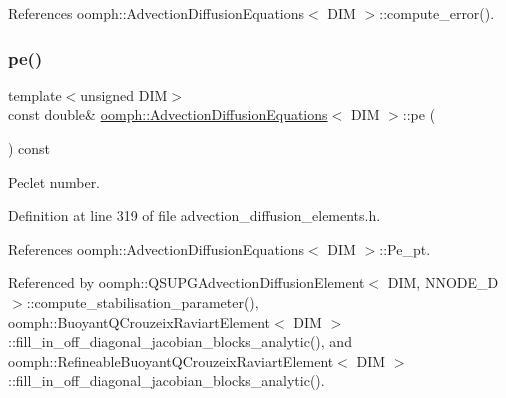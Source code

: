 References oomph\+::\+Advection\+Diffusion\+Equations$<$ D\+I\+M $>$\+::compute\+\_\+error().

\mbox{\label{classoomph_1_1AdvectionDiffusionEquations_ae1dd3fb5d07e98ad2a6b1e38f2f4dc3c}} 
\subsubsection{\texorpdfstring{pe()}{pe()}}
{\footnotesize\ttfamily template$<$unsigned D\+IM$>$ \\
const double\& \hyperlink{classoomph_1_1AdvectionDiffusionEquations}{oomph\+::\+Advection\+Diffusion\+Equations}$<$ D\+IM $>$\+::pe (\begin{DoxyParamCaption}{ }\end{DoxyParamCaption}) const\hspace{0.3cm}{\ttfamily [inline]}}



Peclet number. 



Definition at line 319 of file advection\+\_\+diffusion\+\_\+elements.\+h.



References oomph\+::\+Advection\+Diffusion\+Equations$<$ D\+I\+M $>$\+::\+Pe\+\_\+pt.



Referenced by oomph\+::\+Q\+S\+U\+P\+G\+Advection\+Diffusion\+Element$<$ D\+I\+M, N\+N\+O\+D\+E\+\_\+D $>$\+::compute\+\_\+stabilisation\+\_\+parameter(), oomph\+::\+Buoyant\+Q\+Crouzeix\+Raviart\+Element$<$ D\+I\+M $>$\+::fill\+\_\+in\+\_\+off\+\_\+diagonal\+\_\+jacobian\+\_\+blocks\+\_\+analytic(), and oomph\+::\+Refineable\+Buoyant\+Q\+Crouzeix\+Raviart\+Element$<$ D\+I\+M $>$\+::fill\+\_\+in\+\_\+off\+\_\+diagonal\+\_\+jacobian\+\_\+blocks\+\_\+analytic().

\mbox{\label{classoomph_1_1AdvectionDiffusionEquations_a6757b4e9313b562812a21b49f167a114}} 
